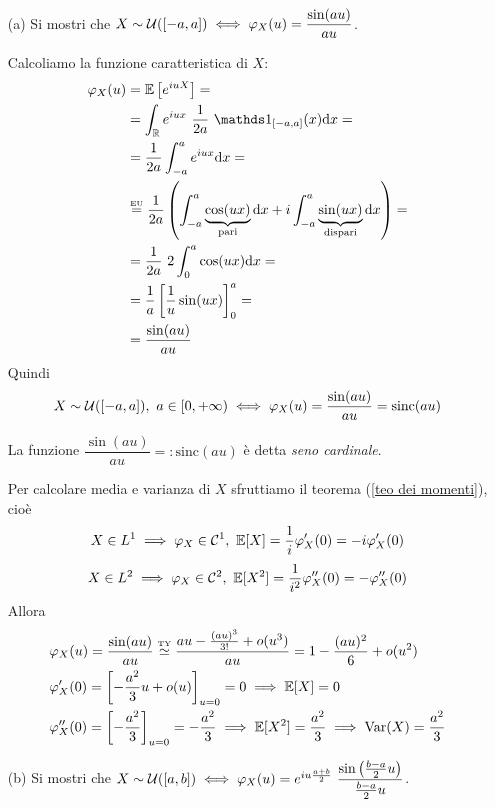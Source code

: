 \Soluzione{} %
\begin{enumerate}
\item [(a)] Si mostri che $X\sim \mathcal{U}([-a,a])\iff\varphi_X(u)=\dfrac{\sin(au)}{au}$.

Calcoliamo la funzione caratteristica di $X$:
\begin{gather*}
\begin{aligned}
\varphi_X(u)&=\EE\left[e^{iuX}  \right]=\\
&=\int_\RR e^{iux}\ \frac{1}{2a}\ \Ind_{[-a,a]}(x)\dx=\\
&=\frac{1}{2a}\int_{-a}^ae^{iux}\dx=\\
&\overset{\underset{\text{EU}}{}}{=}\frac{1}{2a}\left(\int_{-a}^a\underbrace{\cos(ux)}_{\text{pari}}\dx+i\int_{-a}^a\underbrace{\sin(ux)}_{\text{dispari}}\dx  \right)=\\
&=\frac{1}{2a}\ 2\int_{0}^a\cos(ux)\dx=\\
&=\frac{1}{a}\left[\frac{1}{u} \sin(ux)  \right]_0^a=\\
&=\frac{\sin(au)}{au}
\end{aligned}
\end{gather*}
Quindi
\[
X\sim \Uc([-a,a]),\ a\in[0,+\infty)\iff\varphi_X(u)=\frac{\sin(au)}{au}=\text{sinc}(au)
\]
\begin{oss}
La funzione $\dfrac{\sin(au)}{au}=:\text{sinc}(au)$ è detta \emph{seno cardinale}.
\end{oss}
Per calcolare media e varianza di $X$ sfruttiamo il teorema (\ref{teo dei momenti}), cioè
\[
X\in L^1\implies\varphi_X\in\Cu,\ \EE[X]=\frac{1}{i}\varphi_X'(0)=-i\varphi_X'(0)
\]
\[
X\in L^2\implies\varphi_X\in\mathcal{C}^2,\ \EE[X^2]=\frac{1}{i^2}\varphi_X''(0)=-\varphi_X''(0)
\]
Allora
\begin{gather*}
\begin{aligned}
&\varphi_X(u)=\frac{\sin(au)}{au}\overset{\underset{\text{TY}}{}}{\simeq}\frac{au-\frac{(au)^3}{3!}+o(u^3)}{au}=1-\frac{(au)^2}{6}+o(u^2) \\
&\varphi_X'(0)=\left[-\frac{a^2}{3}u+o(u) \right]_{u=0}=0\implies\mathbb{E}[X]=0\\
&\varphi_X''(0)=\left[-\frac{a^2}{3} \right]_{u=0}=-\frac{a^2}{3}\implies\mathbb{E}[X^2]=\frac{a^2}{3}\implies \operatorname{Var}(X)=\frac{a^2}{3}\\
\end{aligned}
\end{gather*}

\item [(b)] Si mostri che $X\sim  \Uc([a,b])\iff\varphi_X(u)=e^{iu\frac{a+b}{2}}\ \dfrac{\sin\left(\frac{b-a}{2}u\right)}{\frac{b-a}{2}u}$.


\end{enumerate}

